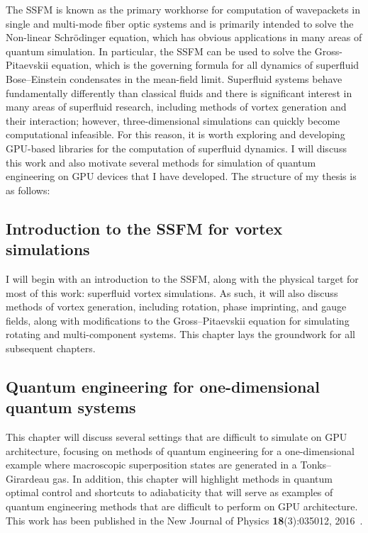The SSFM is known as the primary workhorse for computation of wavepackets in single and multi-mode fiber optic systems and is primarily intended to solve the Non-linear Schr\"odinger equation, which has obvious applications in many areas of quantum simulation.
In particular, the SSFM can be used to solve the Gross-Pitaevskii equation, which is the governing formula for all dynamics of superfluid Bose--Einstein condensates in the mean-field limit.
Superfluid systems behave fundamentally differently than classical fluids and there is significant interest in many areas of superfluid research, including methods of vortex generation and their interaction; however, three-dimensional simulations can quickly become computational infeasible.
For this reason, it is worth exploring and developing GPU-based libraries for the computation of superfluid dynamics.
I will discuss this work and also motivate several methods for simulation of quantum engineering on GPU devices that I have developed.
The structure of my thesis is as follows:

\subsection*{Introduction to the SSFM for vortex simulations}

I will begin with an introduction to the SSFM, along with the physical target for most of this work: superfluid vortex simulations.
As such, it will also discuss methods of vortex generation, including rotation, phase imprinting, and gauge fields, along with modifications to the Gross--Pitaevskii equation for simulating rotating and multi-component systems.
This chapter lays the groundwork for all subsequent chapters.

\subsection*{Quantum engineering for one-dimensional quantum systems}

This chapter will discuss several settings that are difficult to simulate on GPU architecture, focusing on methods of quantum engineering for a one-dimensional example where macroscopic superposition states are generated in a Tonks--Girardeau gas.
In addition, this chapter will highlight methods in quantum optimal control and shortcuts to adiabaticity that will serve as examples of quantum engineering methods that are difficult to perform on GPU architecture.
This work has been published in the New Journal of Physics \textbf{18}(3):035012, 2016~\cite{schloss2016}.



